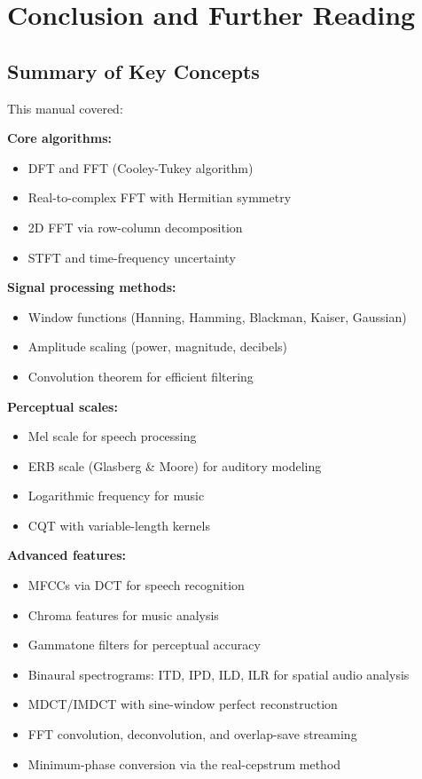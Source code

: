 \section{Conclusion and Further Reading}

\subsection{Summary of Key Concepts}

This manual covered:

\textbf{Core algorithms:}
\begin{itemize}
  \item DFT and FFT (Cooley-Tukey algorithm)
  \item Real-to-complex FFT with Hermitian symmetry
  \item 2D FFT via row-column decomposition
  \item STFT and time-frequency uncertainty
\end{itemize}

\textbf{Signal processing methods:}
\begin{itemize}
  \item Window functions (Hanning, Hamming, Blackman, Kaiser, Gaussian)
  \item Amplitude scaling (power, magnitude, decibels)
  \item Convolution theorem for efficient filtering
\end{itemize}

\textbf{Perceptual scales:}
\begin{itemize}
  \item Mel scale for speech processing
  \item ERB scale (Glasberg \& Moore) for auditory modeling
  \item Logarithmic frequency for music
  \item CQT with variable-length kernels
\end{itemize}

\textbf{Advanced features:}
\begin{itemize}
  \item MFCCs via DCT for speech recognition
  \item Chroma features for music analysis
  \item Gammatone filters for perceptual accuracy
  \item Binaural spectrograms: ITD, IPD, ILD, ILR for spatial audio analysis
  \item MDCT/IMDCT with sine-window perfect reconstruction
  \item FFT convolution, deconvolution, and overlap-save streaming
  \item Minimum-phase conversion via the real-cepstrum method
\end{itemize}

